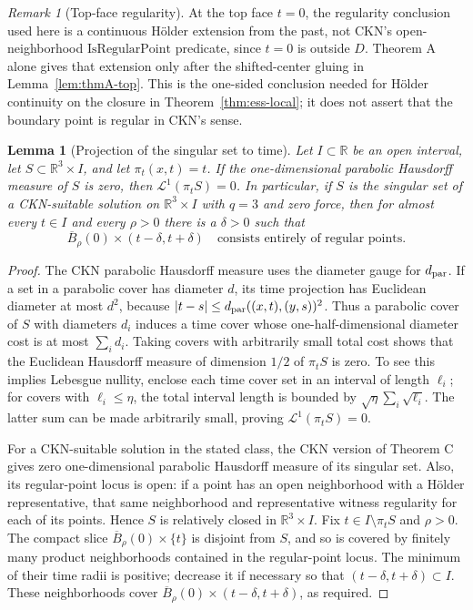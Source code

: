 \documentclass[11pt,letterpaper]{article}
\numberwithin{equation}{section}
\theoremstyle{plain}
\newtheorem{lemma}[theorem]{Lemma}
\theoremstyle{definition}
\theoremstyle{remark}
\newtheorem{remark}[theorem]{Remark}
\begin{document}
\begin{remark}[Top-face regularity]
At the top face $t=0$, the regularity conclusion used here is a continuous
Hölder extension from the past, not CKN's open-neighborhood
$\mathrm{IsRegularPoint}$ predicate, since $t=0$ is outside $D$.  Theorem A
alone gives that extension only after the shifted-center gluing in
Lemma~\ref{lem:thmA-top}.  This is the one-sided conclusion needed for
Hölder continuity on the closure in Theorem~\ref{thm:ess-local}; it does
not assert that the boundary point is regular in CKN's sense.
\end{remark}

\begin{lemma}[Projection of the singular set to time]\label{lem:time-projection}
Let $I\subset\mathbb R$ be an open interval, let
$S\subset\mathbb R^3\times I$, and let $\pi_t(x,t)=t$.  If the
one-dimensional parabolic Hausdorff measure of $S$ is zero, then
$\mathcal L^1(\pi_tS)=0$.  In particular, if $S$ is the singular set of a
CKN-suitable solution on $\mathbb R^3\times I$ with $q=3$ and zero force,
then for almost every $t\in I$ and every $\rho>0$ there is a $\delta>0$
such that
\[
 \overline B_\rho(0)\times(t-\delta,t+\delta)
 \quad\text{consists entirely of regular points.}
\]
\end{lemma}

\begin{proof}
The CKN parabolic Hausdorff measure uses the diameter gauge for
$d_{\rm par}$.  If a set in a parabolic cover has diameter $d$, its time
projection has Euclidean diameter at most $d^2$, because
$|t-s|\le d_{\rm par}((x,t),(y,s))^2$.  Thus a parabolic cover of $S$ with
diameters $d_i$ induces a time cover whose one-half-dimensional diameter
cost is at most $\sum_i d_i$.  Taking covers with arbitrarily small total
cost shows that the Euclidean Hausdorff measure of dimension $1/2$ of
$\pi_tS$ is zero.  To see this implies Lebesgue nullity, enclose each time
cover set in an interval of length $\ell_i$; for covers with
$\ell_i\le\eta$, the total interval length is bounded by
$\sqrt{\eta}\sum_i\sqrt{\ell_i}$.  The latter sum can be made arbitrarily
small, proving $\mathcal L^1(\pi_tS)=0$.

For a CKN-suitable solution in the stated class, the CKN version of
Theorem C gives zero one-dimensional parabolic Hausdorff measure of its
singular set.  Also, its regular-point locus is open: if a point has an
open neighborhood with a Hölder representative, that same neighborhood
and representative witness regularity for each of its points.  Hence $S$
is relatively closed in $\mathbb R^3\times I$.  Fix
$t\in I\setminus\pi_tS$ and $\rho>0$.  The compact slice
$\overline B_\rho(0)\times\{t\}$ is disjoint from $S$, and so is covered by
finitely many product neighborhoods contained in the regular-point locus.
The minimum of their time radii is positive; decrease it if necessary so
that $(t-\delta,t+\delta)\subset I$.  These neighborhoods cover
$\overline B_\rho(0)\times(t-\delta,t+\delta)$, as required.
\end{proof}
\end{document}
